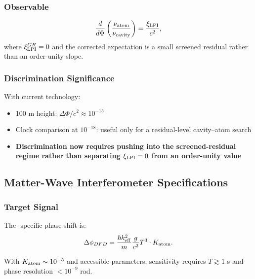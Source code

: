 \subsubsection{Observable}

\begin{equation}
\frac{d}{d\Phi}\left(\frac{\nu_{\rm atom}}{\nu_{\rm cavity}}\right) = \frac{\xi_{\rm LPI}}{c^2},
\end{equation}
where $\xi_{\rm LPI}^{GR}=0$ and the corrected \DFD expectation is a small screened residual rather than an order-unity slope.

\subsubsection{Discrimination Significance}

With current technology:
\begin{itemize}
\item 100 m height: $\Delta\Phi/c^2 \approx 10^{-15}$
\item Clock comparison at $10^{-18}$: useful only for a residual-level cavity--atom search
\item \textbf{Discrimination now requires pushing into the screened-residual regime rather than separating $\xi_{\rm LPI}=0$ from an order-unity value}
\end{itemize}

\subsection{Matter-Wave Interferometer Specifications}\label{app:matter_wave_protocol}

\subsubsection{Target Signal}

The \DFD-specific phase shift is:
\begin{equation}
\Delta\phi_{DFD} = \frac{\hbar k_{\rm eff}^2}{m}\frac{g}{c^2}T^3 \cdot K_{\rm atom}.
\end{equation}

With $K_{\rm atom} \sim 10^{-5}$ and accessible parameters, sensitivity 
requires $T \gtrsim 1$ s and phase resolution $< 10^{-9}$ rad.

